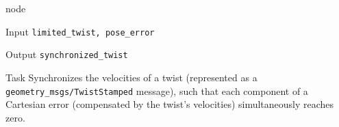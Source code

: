 \begin{frame}{ node}
\begin{alertblock}{Input}
\texttt{limited\_twist, pose\_error}
\end{alertblock}

\begin{alertblock}{Output}
\texttt{synchronized\_twist}
\end{alertblock}

\begin{alertblock}{Task}
Synchronizes the velocities of a twist (represented as a \texttt{geometry\_msgs/TwistStamped} message), such that each component of a Cartesian error (compensated by the twist's velocities) simultaneously reaches zero.
\end{alertblock}
\end{frame}

